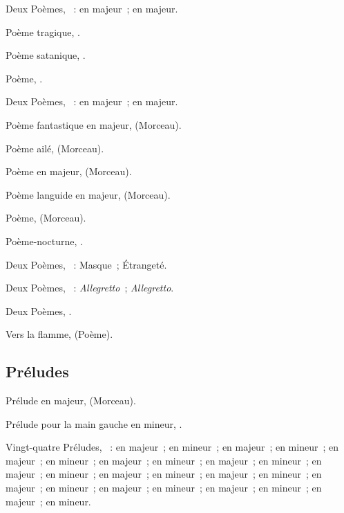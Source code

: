 Deux Poèmes, ~:  en \kF \Sharp majeur~;  en \kD
majeur.

Poème tragique, .

Poème satanique, .

Poème, .

Deux Poèmes, ~:  en \kC majeur~;  en \kC
majeur.

Poème fantastique en \kC majeur,   (Morceau).

Poème ailé,   (Morceau).

Poème en \kC majeur,   (Morceau).

Poème languide en \kB majeur,   (Morceau).

Poème,   (Morceau).

Poème-nocturne, .

Deux Poèmes, ~:  Masque~;  Étrangeté.

Deux Poèmes, ~:  \emph{Allegretto}~; 
\emph{Allegretto}.

Deux Poèmes, .

Vers la flamme,  (Poème).

\subsection{Préludes}


Prélude en \kB majeur,   (Morceau).

Prélude pour la main gauche en \kC \Sharp mineur,  .

Vingt-quatre Préludes, ~:  en \kC majeur~;  en
\kA mineur~;  en \kG majeur~;  en \kE mineur~;
 en \kD majeur~;  en \kB mineur~;  en \kA
majeur~;  en \kF \Sharp mineur~;  en \kE majeur~;
 en \kC \Sharp mineur~;  en \kB majeur~; 
en \kG \Sharp mineur~;  en \kG \Flat majeur~;  en \kE
\Flat mineur~;  en \kD \Flat majeur~;  en \kB \Flat
mineur~;  en \kA \Flat majeur~;  en \kF mineur~;
 en \kE \Flat majeur~;  en \kC mineur~;  en
\kB \Flat majeur~;  en \kG mineur~;  en \kF majeur~;
 en \kD mineur.

